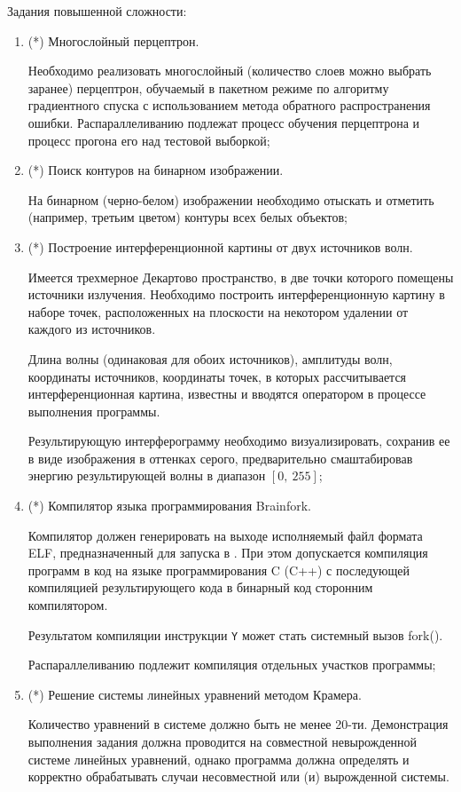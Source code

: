 Задания повышенной сложности:

\begin{enumerate}

	\item (*) Многослойный перцептрон.

		Необходимо реализовать многослойный (количество слоев можно выбрать заранее) перцептрон, обучаемый в пакетном режиме по алгоритму градиентного спуска с использованием метода обратного распространения ошибки. Распараллеливанию подлежат процесс обучения перцептрона и процесс прогона его над тестовой выборкой;

	\item (*) Поиск контуров на бинарном изображении.

		На бинарном (черно-белом) изображении необходимо отыскать и отметить (например, третьим цветом) контуры всех белых объектов;
	
	\item (*) Построение интерференционной картины от двух источников волн.

		Имеется трехмерное Декартово пространство, в две точки которого помещены источники излучения. Необходимо построить интерференционную картину в наборе точек, расположенных на плоскости на некотором удалении от каждого из источников.
		
		Длина волны (одинаковая для обоих источников), амплитуды волн, координаты источников, координаты точек, в которых рассчитывается интерференционная картина, известны и вводятся оператором в процессе выполнения программы.

		Результирующую интерферограмму необходимо визуализировать, сохранив ее в виде изображения в оттенках серого, предварительно смаштабировав энергию результирующей волны в диапазон $[0,~255]$;
	
	\item (*) Компилятор языка программирования Brainfork.

		Компилятор должен генерировать на выходе исполняемый файл формата ELF, предназначенный для запуска в \gl. При этом допускается компиляция программ в код на языке программирования C (C++) с последующей компиляцией результирующего кода в бинарный код сторонним компилятором.
		
		Результатом компиляции инструкции \verb|Y| может стать системный вызов fork().

		Распараллеливанию подлежит компиляция отдельных участков программы;
	
	\item (*) Решение системы линейных уравнений методом Крамера.

		Количество уравнений в системе должно быть не менее 20-ти. Демонстрация выполнения задания должна проводится на совместной невырожденной системе линейных уравнений, однако программа должна определять и корректно обрабатывать случаи несовместной или (и) вырожденной системы.

\end{enumerate}

